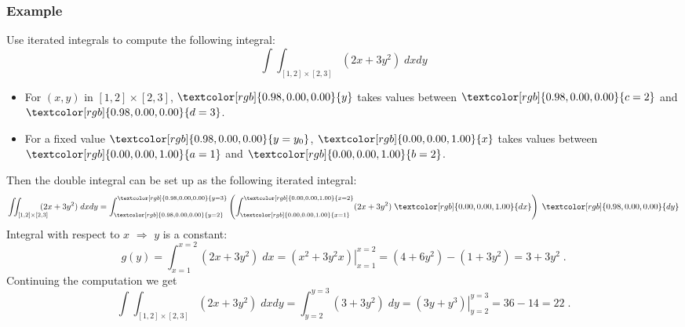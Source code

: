 \begin{frame}
  \frametitle{Example}

Use iterated integrals to compute the following integral:
%
$$\int\!\!\!\int_{[1,2]\times [2,3]}\!\!\!\!\!\! (2x+3y^2) \; dxdy$$
%
\begin{itemize}
  \item \pause For $(x,y)$ in $[1,2]\times [2,3]$, $\textcolor[rgb]{0.98,0.00,0.00}{y}$ takes values \pause between $\textcolor[rgb]{0.98,0.00,0.00}{c=2}$ and $\textcolor[rgb]{0.98,0.00,0.00}{d=3}$.
  \item \pause For a fixed value $\textcolor[rgb]{0.98,0.00,0.00}{y=y_0}$, $\textcolor[rgb]{0.00,0.00,1.00}{x}$ takes values \pause between $\textcolor[rgb]{0.00,0.00,1.00}{a=1}$ and $\textcolor[rgb]{0.00,0.00,1.00}{b=2}$.
\end{itemize}
\pause
Then the double integral can be set up as the following iterated integral:
%
$$\int\!\!\!\int_{[1,2]\times [2,3]}\!\!\!\!\!\! (2x+3y^2) \; dxdy = \int_{\textcolor[rgb]{0.98,0.00,0.00}{y=2}}^{\textcolor[rgb]{0.98,0.00,0.00}{y=3}} \left( \int_{\textcolor[rgb]{0.00,0.00,1.00}{x=1}}^{\textcolor[rgb]{0.00,0.00,1.00}{x=2}} (2x+3y^2) \; \textcolor[rgb]{0.00,0.00,1.00}{dx} \right) \; \textcolor[rgb]{0.98,0.00,0.00}{dy} $$
\pause
Integral with respect to $x$ \pause $\Longrightarrow$ $y$ is a constant:
%
$$g(y) = \int_{x=1}^{x=2} (2x+3y^2) \; dx = \left. (x^2+3y^2x) \right|_{x=1}^{x=2} = (4+6y^2)-(1+3y^2) = 3+3y^2\; .$$
%
\pause Continuing the computation we get\pause
%
$$\int\!\!\!\int_{[1,2]\times [2,3]}\!\!\!\!\!\! (2x+3y^2) \; dxdy = \int_{y=2}^{y=3} (3+3y^2)\; dy = \left. (3y+y^3) \right|_{y=2}^{y=3} = 36-14=22\; .$$
\end{frame}